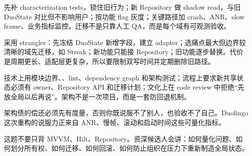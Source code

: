 \begin{followup}[“重构期间如何保证不出回归？”]
先补 characterization tests，锁住旧行为；新 Repository 做 shadow read，与旧 DuoState 对比但不影响用户；按功能 flag 灰度；关键路径加 crash、ANR、slow frame、业务指标监控。迁移不是只靠人工 QA，而是每个域有可观测验收。
\end{followup}

\begin{followup}[“如果不允许停更怎么办？”]
采用 strangler：先冻结 DuoState 新增字段，建立 adapter；选痛点最大但边界较清晰的域先迁移，如 Streak；新功能只能接 Repository；旧功能逐步替换。代价是周期更长、适配层更复杂，所以要限制双写时间并定期删除旧路径。
\end{followup}

\begin{followup}
技术上用模块边界、、lint、dependency graph 和架构测试；流程上要求新共享状态必须有 owner、Repository API 和迁移计划；文化上在 code review 中拒绝“先放全局以后再说”。架构不是一次项目，而是一套防回退机制。
\end{followup}

\begin{idea}[度量是架构债的入口和出口]
架构债的偿还必须先有度量，否则你既说服不了别人，也验收不了自己。Duolingo 这次重构的说服力正来自 ANR、慢帧、滚动和启动时间这些可量化指标。
\end{idea}

\begin{keypoint}[资深度信号]
这题不要只背 MVVM、Hilt、Repository。资深候选人会讲：如何量化问题、如何划分所有权、如何迁移、如何回滚、如何防止组织在压力下重新制造全局状态。
\end{keypoint}



